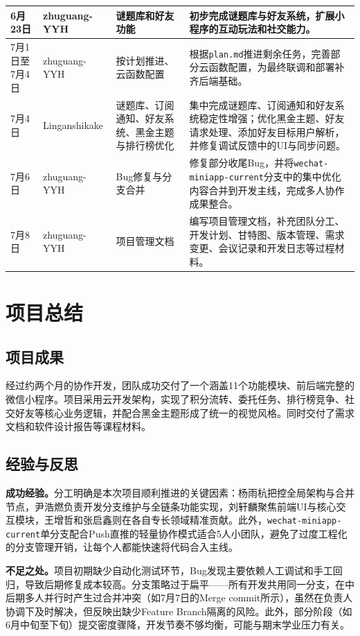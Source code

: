 \documentclass[a4paper,12pt]{article}
\begin{document}
\begin{longtable}{|>{\raggedright\arraybackslash}p{1.9cm}|>{\raggedright\arraybackslash}p{2.6cm}|>{\raggedright\arraybackslash}p{3.0cm}|>{\raggedright\arraybackslash}p{5.3cm}|}
6月23日 & zhuguang-YYH & 谜题库和好友功能 & 初步完成谜题库与好友系统，扩展小程序的互动玩法和社交能力。\\ \hline
7月1日至7月4日 & zhuguang-YYH & 按计划推进、云函数配置 & 根据\texttt{plan.md}推进剩余任务，完善部分云函数配置，为最终联调和部署补齐后端基础。\\ \hline
7月4日 & Linganshikake & 谜题库、订阅通知、好友系统、黑金主题与排行榜优化 & 集中完成谜题库、订阅通知和好友系统稳定性增强；优化黑金主题、好友请求处理、添加好友目标用户解析，并修复调试反馈中的UI与同步问题。\\ \hline
7月6日 & zhuguang-YYH & Bug修复与分支合并 & 修复部分收尾Bug，并将\texttt{wechat-miniapp-current}分支中的集中优化内容合并到开发主线，完成多人协作成果整合。\\ \hline
7月8日 & zhuguang-YYH & 项目管理文档 & 编写项目管理文档，补充团队分工、开发计划、甘特图、版本管理、需求变更、会议记录和开发日志等过程材料。\\
\hline
\end{longtable}
\endgroup

\section{项目总结}

\subsection{项目成果}

经过约两个月的协作开发，团队成功交付了一个涵盖11个功能模块、前后端完整的微信小程序。项目采用云开发架构，实现了积分流转、委托任务、排行榜竞争、社交好友等核心业务逻辑，并配合黑金主题形成了统一的视觉风格。同时交付了需求文档和软件设计报告等课程材料。

\subsection{经验与反思}

\textbf{成功经验。}分工明确是本次项目顺利推进的关键因素：杨雨杭把控全局架构与合并节点，尹浩燃负责开发分支维护与全链条功能实现，刘轩麟聚焦前端UI与核心交互模块，王增哲和张启鑫则在各自专长领域精准贡献。此外，\texttt{wechat-miniapp-current}单分支配合Push直推的轻量协作模式适合5人小团队，避免了过度工程化的分支管理开销，让每个人都能快速将代码合入主线。

\textbf{不足之处。}项目初期缺少自动化测试环节，Bug发现主要依赖人工调试和手工回归，导致后期修复成本较高。分支策略过于扁平——所有开发共用同一分支，在中后期多人并行时产生过合并冲突（如7月7日的Merge commit所示），虽然在负责人协调下及时解决，但反映出缺少Feature Branch隔离的风险。此外，部分阶段（如6月中旬至下旬）提交密度骤降，开发节奏不够均衡，可能与期末学业压力有关。
\end{document}
